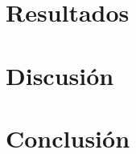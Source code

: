 \documentclass[a4paper,fleqn]{cas-sc}
\begin{document}
\section{Resultados}\label{sec:resultados}

\section{Discusión}\label{sec:discusion}

\section{Conclusión}\label{sec:conclusion}

\printcredits




\end{document}
